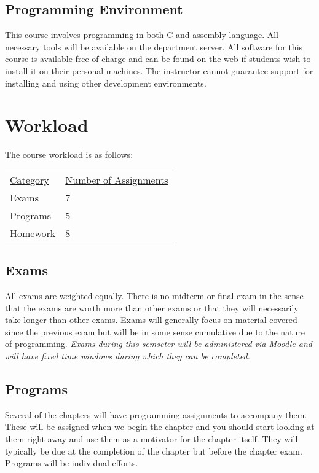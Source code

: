 \documentclass[10pt]{article}
\begin{document}
\subsection{Programming Environment}

This course involves programming in both C and assembly language. All
necessary tools will be available on the department server. All
software for this course is available free of charge and can be found
on the web if students wish to install it on their personal
machines. The instructor cannot guarantee support for installing and
using other development environments.

\section{Workload}

The course workload is as follows:
\begin{center}
  \begin{tabular}{ll}
    \underline{Category} & \underline{Number of Assignments} \\
    Exams & 7 \\
    Programs & 5 \\
    Homework & 8
  \end{tabular}
\end{center}

\subsection*{Exams}

All exams are weighted equally. There is no midterm or final exam in the sense that the exams are worth more than other exams or that they will necessarily take longer than other exams.  Exams will generally focus on material covered since the previous exam but will be in some sense cumulative due to the nature of programming. \textit{Exams during this semseter will be administered via Moodle and will have fixed time windows during which they can be completed.}

\subsection*{Programs}

Several of the chapters will have programming assignments to accompany them. These will be assigned when we begin the chapter and you should start looking at them right away and use them as a motivator for the chapter itself. They will typically be due at the completion of the chapter but before the chapter exam. Programs will be individual efforts.
\end{document}

